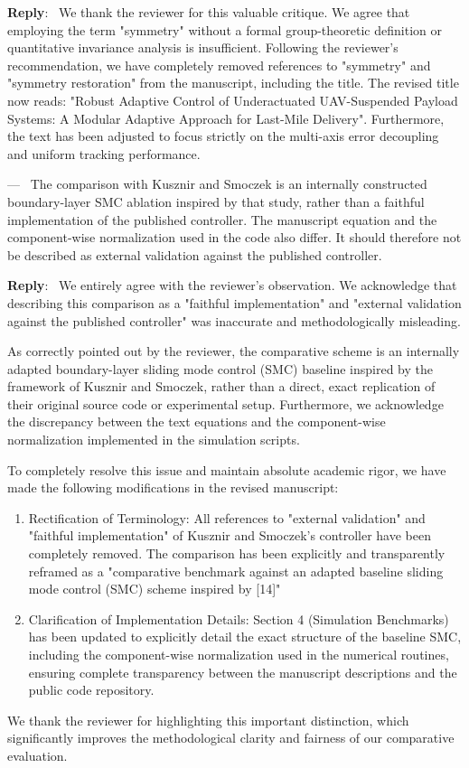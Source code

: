 \documentclass[11pt]{article}
\newcounter{reviewer}
\newcounter{point}[reviewer]
\renewcommand{\thepoint}{Comment\,\thereviewer.\arabic{point}}
\newenvironment{point}
   {\refstepcounter{point} \bigskip \noindent {\textbf{Reviewer~\thepoint} } ---\ }
   {\par }
\newenvironment{reply}
   {\medskip \noindent \color{blue} \begin{sf}\textbf{Reply}:\  }
   {\medskip \par \end{sf}}
\begin{document}
\begin{reply}
We thank the reviewer for this valuable critique. We agree that employing the term "symmetry" without a formal group-theoretic definition or quantitative invariance analysis is insufficient.
Following the reviewer's recommendation, we have completely removed references to "symmetry" and "symmetry restoration" from the manuscript, including the title. The revised title now reads: "Robust Adaptive Control of Underactuated UAV-Suspended Payload Systems: A Modular Adaptive Approach for Last-Mile Delivery". Furthermore, the text has been adjusted to focus strictly on the multi-axis error decoupling and uniform tracking performance.
\end{reply}

\begin{point}
The comparison with Kusznir and Smoczek is an internally constructed boundary-layer SMC ablation inspired by that study, rather than a faithful implementation of the published controller. The manuscript equation and the component-wise normalization used in the code also differ. It should therefore not be described as external validation against the published controller.
\end{point}

\begin{reply}
We entirely agree with the reviewer’s observation. We acknowledge that describing this comparison as a "faithful implementation" and "external validation against the published controller" was inaccurate and methodologically misleading.

As correctly pointed out by the reviewer, the comparative scheme is an internally adapted boundary-layer sliding mode control (SMC) baseline inspired by the framework of Kusznir and Smoczek, rather than a direct, exact replication of their original source code or experimental setup. Furthermore, we acknowledge the discrepancy between the text equations and the component-wise normalization implemented in the simulation scripts.

To completely resolve this issue and maintain absolute academic rigor, we have made the following modifications in the revised manuscript:
\begin{enumerate}
\item Rectification of Terminology: All references to "external validation" and "faithful implementation" of Kusznir and Smoczek's controller have been completely removed. The comparison has been explicitly and transparently reframed as a "comparative benchmark against an adapted baseline sliding mode control (SMC) scheme inspired by [14]"
\item Clarification of Implementation Details: Section 4 (Simulation Benchmarks) has been updated to explicitly detail the exact structure of the baseline SMC, including the component-wise normalization used in the numerical routines, ensuring complete transparency between the manuscript descriptions and the public code repository.
\end{enumerate}
We thank the reviewer for highlighting this important distinction, which significantly improves the methodological clarity and fairness of our comparative evaluation.
\end{reply}
\end{document}
